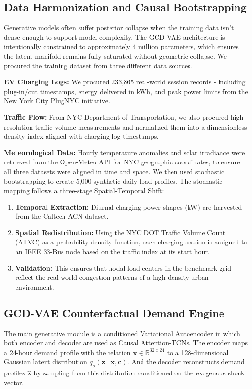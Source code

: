 \documentclass[conference]{IEEEtran}
\begin{document}
\subsection{Data Harmonization and Causal Bootstrapping}

Generative models often suffer posterior collapse when the training data isn't dense enough to support model complexity. The GCD-VAE architecture is intentionally constrained to approximately 4 million parameters, which ensures the latent manifold remains fully saturated without geometric collapse. We procured the training dataset from three different data sources.

\textbf{EV Charging Logs:} We procured 233{,}865 real-world session records - including plug-in/out timestamps, energy delivered in kWh, and peak power limits from the New York City PlugNYC initiative.

\textbf{Traffic Flow:} From NYC Department of Transportation, we also procured high-resolution traffic volume measurements and normalized them into a dimensionless density index aligned with charging log timestamps.

\textbf{Meteorological Data:} Hourly temperature anomalies and solar irradiance were retrieved from the Open-Meteo API for NYC geographic coordinates, to ensure all three datasets were aligned in time and space. We then used stochastic bootstrapping to create 5,000 synthetic daily load profiles. 
The stochastic mapping follows a three-stage Spatial-Temporal Shift: 
\begin{enumerate}
    \item \textbf{Temporal Extraction:} Diurnal charging power shapes (kW) are harvested from the Caltech ACN dataset. 
    \item \textbf{Spatial Redistribution:} Using the NYC DOT Traffic Volume Count (ATVC) as a probability density function, each charging session is assigned to an IEEE 33-Bus node based on the traffic index at its start hour. 
    \item \textbf{Validation:} This ensures that nodal load centers in the benchmark grid reflect the real-world congestion patterns of a high-density urban environment.
\end{enumerate}

\subsection{GCD-VAE Counterfactual Demand Engine}

The main generative module is a conditioned Variational Autoencoder in which both encoder and decoder are used as Causal Attention-TCNs. The encoder maps a 24-hour demand profile with the relation $\mathbf{x} \in \mathbb{R}^{32 \times 24}$ to a 128-dimensional Gaussian latent distribution $q_\phi(\mathbf{z} \mid \mathbf{x}, \mathbf{c})$. And the decoder reconstructs demand profiles $\hat{\mathbf{x}}$ by sampling from this distribution conditioned on the exogenous shock vector.
\end{document}
